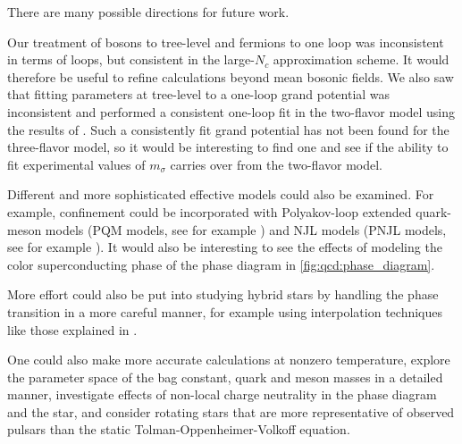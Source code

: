 There are many possible directions for future work.

Our treatment of bosons to tree-level and fermions to one loop was inconsistent in terms of loops,
but consistent in the large-$N_c$ approximation scheme.
It would therefore be useful to refine calculations beyond mean bosonic fields.
We also saw that fitting parameters at tree-level to a one-loop grand potential was inconsistent
and performed a consistent one-loop fit in the two-flavor model using the results of \cite{ref:jo_lsm_consistent_chiral,ref:jo_lsm_consistent_physical}.
Such a consistently fit grand potential has not been found for the three-flavor model,
so it would be interesting to find one and see if the ability to fit experimental values of $m_\sigma$ carries over from the two-flavor model.

Different and more sophisticated effective models could also be examined.
For example, confinement could be incorporated with Polyakov-loop extended quark-meson models (PQM models, see for example \cite{ref:pqm_2f,ref:pqm_3f,ref:master_folkestad}) and NJL models (PNJL models, see for example \cite{ref:pnjl_2f,ref:pnjl_3f,ref:pnjl_3f_zeroT}).
It would also be interesting to see the effects of modeling the color superconducting phase of the phase diagram in \cref{fig:qcd:phase_diagram}.

More effort could also be put into studying hybrid stars by handling the phase transition in a more careful manner,
for example using interpolation techniques like those explained in \cite{ref:quark_star_review}.

One could also make more accurate calculations at nonzero temperature,
explore the parameter space of the bag constant, quark and meson masses in a detailed manner,
investigate effects of non-local charge neutrality in the phase diagram and the star,
and consider rotating stars that are more representative of observed pulsars than the static Tolman-Oppenheimer-Volkoff equation.
